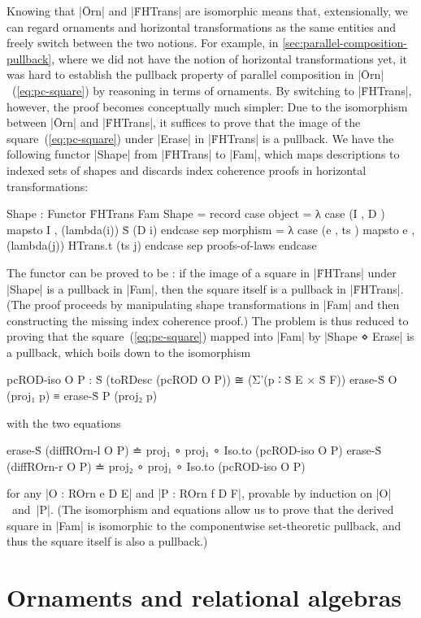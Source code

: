 Knowing that |Ōrn| and |ḞHTrans| are isomorphic means that, extensionally, we can regard ornaments and horizontal transformations as the same entities and freely switch between the two notions.
For example, in \autoref{sec:parallel-composition-pullback}, where we did not have the notion of horizontal transformations yet, it was hard to establish the pullback property of parallel composition in |Ōrn|~(\ref{eq:pc-square}) by reasoning in terms of ornaments.
By switching to |ḞHTrans|, however, the proof becomes conceptually much simpler:
Due to the isomorphism between |Ōrn| and |ḞHTrans|, it suffices to prove that the image of the square~(\ref{eq:pc-square}) under |Erase| in |ḞHTrans| is a pullback.
We have the following functor |Shape| from |ḞHTrans| to |Fam|, which maps descriptions to indexed sets of shapes and discards index coherence proofs in horizontal transformations:
\begin{code}
Shape : Functor ḞHTrans Fam
Shape = record
  case  object    = λ case (I , D   ) mapsto I  , (lambda(i)) Ṡ (D i)            endcase
  sep   morphism  = λ case (e , ts  ) mapsto e  , (lambda({j})) HTrans.t (ts j)  endcase
  sep   proofs-of-laws endcase
\end{code}
The functor can be proved to be : if the image of a square in |ḞHTrans| under |Shape| is a pullback in |Fam|, then the square itself is a pullback in |ḞHTrans|.
(The proof proceeds by manipulating shape transformations in |Fam| and then constructing the missing index coherence proof.)
The problem is thus reduced to proving that the square~(\ref{eq:pc-square}) mapped into |Fam| by |Shape ⋄ Erase| is a pullback, which boils down to the isomorphism
\begin{code}
pcROD-iso O P :  Ṡ (toRDesc (pcROD O P))
                   ≅ (Σ'(p ∶ Ṡ E × Ṡ F)) erase-Ṡ O (proj₁ p) ≡ erase-Ṡ P (proj₂ p)
\end{code}
with the two equations
\begin{code}
erase-Ṡ (diffROrn-l  O P) ≐ proj₁  ∘ proj₁ ∘ Iso.to (pcROD-iso O P)
erase-Ṡ (diffROrn-r  O P) ≐ proj₂  ∘ proj₁ ∘ Iso.to (pcROD-iso O P)
\end{code}
for any |O : ROrn e D E| and |P : ROrn f D F|, provable by induction on |O|~and~|P|.
(The isomorphism and equations allow us to prove that the derived square in |Fam| is isomorphic to the componentwise set-theoretic pullback, and thus the square itself is also a pullback.)

\section{Ornaments and relational algebras}
\label{sec:ornaments-and-relational-algebras}

